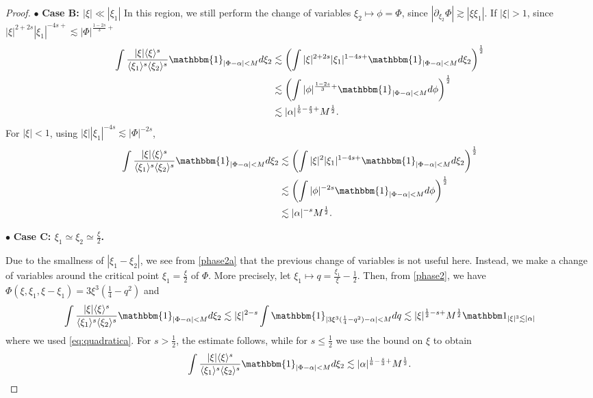 \documentclass[%
11pt,  reqno]{amsart}
\newcommand{\fia}{\mathbbm{1}_{|\Phi-\alpha|<M}}
\newcommand{\jap}[1]{\langle #1 \rangle}
\newcommand{\5}{\textup{V}}
\newcommand{\noi}{\noindent}
\newcommand{\ind}{\mathbbm 1}
\newcommand{\les}{\lesssim}
\theoremstyle{remark}
\newcommand{\bul}{\bullet}
\newcommand{\al}{\alpha}
\numberwithin{equation}{section}
\numberwithin{theorem}{section}
\begin{document}
\begin{proof}
\smallskip

\noi
$\bul$ 
\textbf{Case B: $|\xi| \ll |\xi_1|$} In this region, we still perform the change of variables $\xi_2\mapsto \phi=\Phi$, since $|\partial_{\xi_2}\Phi|\gtrsim |\xi\xi_1|$. If $|\xi|>1$, since $|\xi|^{2+2s}|\xi_1|^{-4s+}\lesssim |\Phi|^{\frac{1-2s}{3}+} $
\begin{align*}
    \int \frac{|\xi|\jap{\xi}^s}{\jap{\xi_1}^s\jap{\xi_2}^s}\fia d\xi_2 &\lesssim \left(\int |\xi|^{2+2s}|\xi_1|^{1-4s+}\fia d\xi_2\right)^\frac12\\& \lesssim \left(\int |\phi|^{\frac{1-2s}{3}+}\fia d\phi\right)^\frac12\\&\lesssim |\alpha|^{\frac16 - \frac s3 +} M^{\frac12}.
\end{align*}
For $|\xi|<1$, using $|\xi||\xi_1|^{-4s}\lesssim |\Phi|^{-2s}$,
\begin{align*}
    \int \frac{|\xi|\jap{\xi}^s}{\jap{\xi_1}^s\jap{\xi_2}^s}\fia d\xi_2 &\lesssim \left(\int |\xi|^{2}|\xi_1|^{1-4s+}\fia d\xi_2\right)^\frac12\\& \lesssim \left(\int |\phi|^{-2s}\fia d\phi\right)^\frac12\\&\lesssim |\alpha|^{-s} M^{\frac12}.
\end{align*}

\smallskip

\noi
$\bul$ 
\textbf{Case C: $\xi_1\simeq \xi_2 \simeq \frac{\xi}{2}$.} 

Due to the smallness of $|\xi_1-\xi_2|$, we see from \eqref{phase2a} that the previous change of variables is not useful here. Instead,
we make a change of variables around the critical point $\xi_1 = \frac\xi2$ of $\Phi$. More precisely, let $\xi_1 \mapsto q = \frac{\xi_1}{\xi} - \frac12$. Then, from \eqref{phase2}, we have $\Phi (\xi, \xi_1,\xi-\xi_1)=  3 \xi^3 (\frac14 - q^2)$ and 
\begin{align*}
\int \frac{|\xi|\jap{\xi}^s}{\jap{\xi_1}^s\jap{\xi_2}^s}\fia d\xi_2 \lesssim |\xi|^{2-s}\int \mathbbm{1}_{|3 \xi^3 (\frac14 - q^2)-\alpha|<M}dq \les |\xi|^{\frac12-s +} M^\frac12  \ind_{|\xi|^3 \les |\al|}
\end{align*}
where we used \eqref{eq:quadratica}. For $s> \frac12$, the estimate follows, while for $s\le\frac12$ we use the bound on $\xi$ to obtain
\begin{align}
\int \frac{|\xi|\jap{\xi}^s}{\jap{\xi_1}^s\jap{\xi_2}^s}\fia d\xi_2 \les |\alpha|^{\frac16-\frac s3+} M^\frac12. 
\end{align}


\smallskip


\end{proof}
\end{document}
